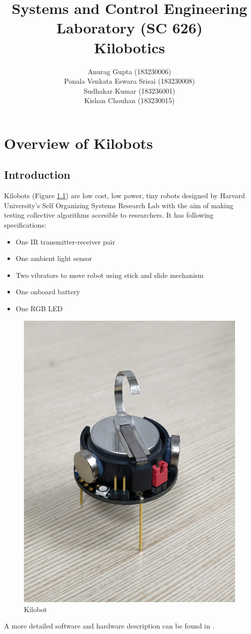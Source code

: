\documentclass{report}[12pt]
\author{Anurag Gupta (183230006) \\ Ponala Venkata Eswara Srisai
(183230008)\\ Sudhakar Kumar (183236001)\\ Kishan Chouhan (183230015)}
\title{Systems and Control Engineering Laboratory (SC 626) \\ Kilobotics}
\begin{document}
\maketitle
\tableofcontents
\thispagestyle{empty}
\mbox{}
\newpage

\chapter{Overview of Kilobots}
\section{Introduction}
Kilobots (Figure \ref{fig:kilobot}) are low cost, low power, tiny robots designed by Harvard University's Self Organizing Systems Research Lab with the aim of making testing collective algorithms accesible to researchers. It has following specifications:
\begin{itemize}
	\item One IR transmitter-receiver pair
	\item One ambient light sensor
	\item Two vibrators to move robot using stick and slide mechanism
	\item One onboard battery
	\item One RGB LED
\end{itemize}
\begin{figure}[H]
	\centering
	\includegraphics[scale=0.04]{images/kilobots}
	\caption{Kilobot}
	\label{fig:kilobot}
\end{figure}
A more detailed software and hardware description can be found in \cite{kilobotics_manual}.
\end{document}

